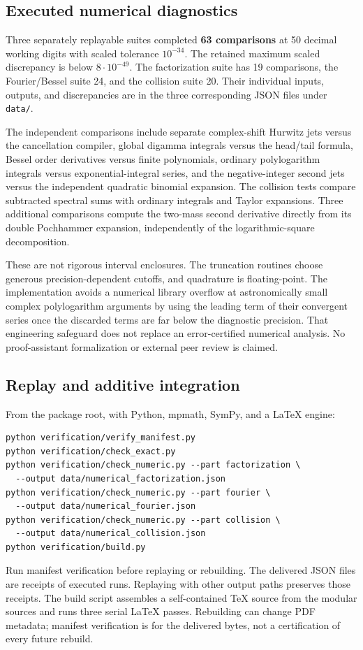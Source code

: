\documentclass[11pt,letterpaper]{article}
\numberwithin{equation}{section}
\theoremstyle{definition}
\newcommand{\file}[1]{\nolinkurl{#1}}
\begin{document}
\subsection{Executed numerical diagnostics}
Three separately replayable suites completed \textbf{63 comparisons}
at 50 decimal working digits with scaled tolerance $10^{-34}$.
The retained maximum scaled discrepancy is below $8\cdot10^{-49}$.
The factorization suite has 19 comparisons, the Fourier/Bessel suite
24, and the collision suite 20. Their individual inputs, outputs,
and discrepancies are in the three corresponding JSON files under
\file{data/}.

The independent comparisons include separate complex-shift Hurwitz
jets versus the cancellation compiler, global digamma integrals
versus the head/tail formula, Bessel order derivatives versus finite
polynomials, ordinary polylogarithm integrals versus exponential-integral
series, and the negative-integer second jets versus the independent
quadratic binomial expansion. The collision tests compare subtracted
spectral sums with ordinary integrals and Taylor expansions. Three
additional comparisons compute the two-mass second derivative directly
from its double Pochhammer expansion, independently of the
logarithmic-square decomposition.

These are not rigorous interval enclosures. The truncation routines
choose generous precision-dependent cutoffs, and quadrature is
floating-point. The implementation avoids a numerical library overflow
at astronomically small complex polylogarithm arguments by using the
leading term of their convergent series once the discarded terms are
far below the diagnostic precision. That engineering safeguard does
not replace an error-certified numerical analysis. No proof-assistant
formalization or external peer review is claimed.

\subsection{Replay and additive integration}
From the package root, with Python, mpmath, SymPy, and a LaTeX engine:
\begin{verbatim}
python verification/verify_manifest.py
python verification/check_exact.py
python verification/check_numeric.py --part factorization \
  --output data/numerical_factorization.json
python verification/check_numeric.py --part fourier \
  --output data/numerical_fourier.json
python verification/check_numeric.py --part collision \
  --output data/numerical_collision.json
python verification/build.py
\end{verbatim}
Run manifest verification before replaying or rebuilding.
The delivered JSON files are receipts of executed runs. Replaying with
other output paths preserves those receipts. The build script assembles
a self-contained TeX source from the modular sources and runs three
serial LaTeX passes. Rebuilding can change PDF metadata; manifest
verification is for the delivered bytes, not a certification of every
future rebuild.
\end{document}
